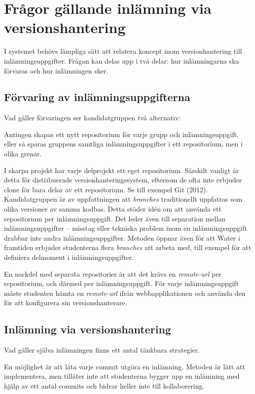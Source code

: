 \section{Frågor gällande inlämning via versionshantering}\label{sec:fragor-git}
I systemet behövs lämpliga sätt att relatera koncept inom versionhantering till inlämningsuppgifter. Frågan kan delas upp i två delar: hur inlämningarna ska förvaras och hur inlämningen sker.

\subsection{Förvaring av inlämningsuppgifterna}
Vad gäller förvaringen ser kandidatgruppen två alternativ:

Antingen skapas ett nytt repositorium för varje grupp och inlämningsuppgift, eller så sparas gruppens samtliga inlämningsuppgifter i ett repositorium, men i olika grenar.

I skarpa projekt har varje delprojekt ett eget repositorium. Särskilt vanligt är detta för distribuerade versionhanteringssystem, eftersom de ofta inte erbjuder clone för bara delar av ett repositorium. Se till exempel Git (2012). Kandidatgruppen är av uppfattningen att \emph{branches} traditionellt uppfattas som olika versioner av samma kodbas. Detta stöder idén om att använda ett repositorium per inlämningsuppgift. Det leder även till separation mellan inlämningsuppgifter – misstag eller tekniska problem inom en inlämningsuppgift  drabbar inte andra inlämningsuppgifter. Metoden öppnar även för att Water i framtiden erbjuder studenterna flera \emph{branches} att arbeta med, till exempel för att definiera delmoment i inlämningsuppgifter.

En nackdel med separata repositorier är att det krävs en \emph{remote-url} per repositorium, och därmed per inlämningsuppgift. För varje inlämningsuppgift måste studenten hämta en \emph{remote-url} ifrån webbapplikationen och använda den för att konfigurera sin versionshanterare.

\subsection{Inlämning via versionshantering}
Vad gäller själva inlämningen finns ett antal tänkbara strategier.

En möjlighet är att låta varje commit utgöra en inlämning. Metoden är lätt att implementera, men tillåter inte att studenterna bygger upp en inlämning med hjälp av ett antal commits och bidrar heller inte till kollaborering.

